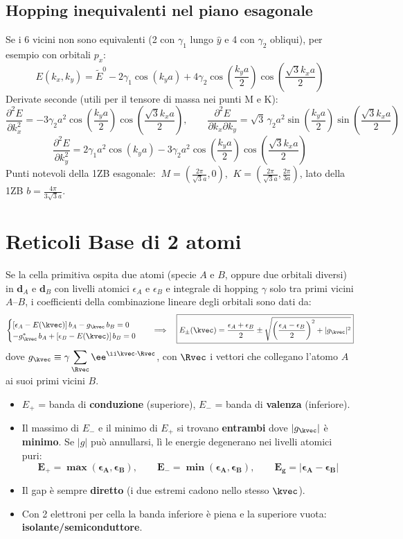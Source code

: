 \subsection{Hopping inequivalenti nel piano esagonale}
Se i 6 vicini non sono equivalenti (2 con $\gamma_1$ lungo $\hat y$ e 4 con $\gamma_2$ obliqui), per esempio con orbitali $p_x$:
\[ E(k_x,k_y) = \tilde E^0 - 2\gamma_1\cos(k_ya) + 4\gamma_2\cos\!\left(\frac{k_ya}{2}\right)\cos\!\left(\frac{\sqrt3 k_xa}{2}\right) \]
Derivate seconde (utili per il tensore di massa nei punti M e K):
\[ \frac{\partial^2E}{\partial k_x^2} = -3\gamma_2a^2\cos\!\left(\frac{k_ya}{2}\right)\cos\!\left(\frac{\sqrt3k_xa}{2}\right),\qquad
   \frac{\partial^2E}{\partial k_x\partial k_y} = \sqrt3\,\gamma_2a^2\sin\!\left(\frac{k_ya}{2}\right)\sin\!\left(\frac{\sqrt3k_xa}{2}\right) \]
\[ \frac{\partial^2E}{\partial k_y^2} = 2\gamma_1a^2\cos(k_ya) - 3\gamma_2a^2\cos\!\left(\frac{k_ya}{2}\right)\cos\!\left(\frac{\sqrt3k_xa}{2}\right) \]
Punti notevoli della 1ZB esagonale: $\ M=\left(\frac{2\pi}{\sqrt3a},0\right)$, $\ K=\left(\frac{2\pi}{\sqrt3a},\frac{2\pi}{3a}\right)$, lato della 1ZB $b=\frac{4\pi}{3\sqrt3 a}$.




\newpage

\section{Reticoli Base di 2 atomi}
Se la cella primitiva ospita due atomi (specie $A$ e $B$, oppure due orbitali diversi) in $\mathbf{d}_A$ e $\mathbf{d}_B$ con livelli atomici $\epsilon_A$ e $\epsilon_B$ e integrale di hopping $\gamma$ solo tra primi vicini $A$--$B$, i coefficienti della combinazione lineare degli orbitali sono dati da:
\[
\begin{cases}
[\epsilon_A - E(\kvec)]\,b_A - g_{\kvec}\, b_B = 0 \\
-g_{\kvec}^{*}\, b_A + [\epsilon_B - E(\kvec)]\,b_B = 0
\end{cases}
\quad\Longrightarrow\quad
\boxed{E_\pm(\kvec) = \frac{\epsilon_A+\epsilon_B}{2} \pm \sqrt{\left(\frac{\epsilon_A-\epsilon_B}{2}\right)^{2} + |g_{\kvec}|^{2}}}
\]
dove $\displaystyle g_{\kvec} \equiv \gamma\sum_{\Rvec}\ee^{\ii\kvec\cdot\Rvec}$, con $\Rvec$ i vettori che collegano l'atomo $A$ ai suoi primi vicini $B$.
\begin{itemize}
  \item $E_+$ = banda di \textbf{conduzione} (superiore), $E_-$ = banda di \textbf{valenza} (inferiore).
  \item Il massimo di $E_-$ e il minimo di $E_+$ si trovano \textbf{entrambi} dove $|g_\kvec|$ è \textbf{minimo}. Se $|g|$ può annullarsi, lì le energie degenerano nei livelli atomici puri:
  \[ \bm{E_+ = \max(\epsilon_A,\epsilon_B)}, \qquad \bm{E_- = \min(\epsilon_A,\epsilon_B)}, \qquad \bm{E_g = |\epsilon_A-\epsilon_B|} \]
  \item Il gap è sempre \textbf{diretto} (i due estremi cadono nello stesso $\kvec$).
  \item Con 2 elettroni per cella la banda inferiore è piena e la superiore vuota: \textbf{isolante/semiconduttore}.
\end{itemize}


